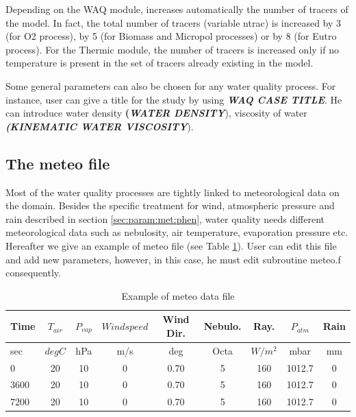  Depending on the WAQ module,  increases automatically the number of tracers of the model. In fact, the total number of tracers (variable ntrac) is increased by 3 (for O2 process), by 5 (for Biomass and Micropol processes) or by 8 (for Eutro process). For the Thermic module, the number of tracers is increased only if no temperature is present in the set of tracers already existing in the model.

 Some general parameters can also be chosen for any water quality process. For instance, user can give a title for the study by using \textbf{\textit{WAQ CASE TITLE}}. He can introduce water density \textbf{(\textit{WATER DENSITY}}), viscosity of water \textbf{\textit{(KINEMATIC WATER VISCOSITY}}).


\subsection{  The meteo file}
\label{subs:meteo:file}
 Most of the water quality processes are tightly linked to meteorological data on the domain. Besides the specific treatment for wind, atmospheric pressure and rain described in section \ref{sec:param:met:phen}, water quality needs different meteorological data such as nebulosity, air temperature, evaporation pressure etc. Hereafter we give an example of meteo file (see Table \ref{tab:meteo}). User can edit this file and add new parameters, however, in this case, he must edit subroutine meteo.f consequently.

\begin{table}
    \centering
  \begin{tabular}{|l|c|c|c|c|c|c|c|c|}
     \hline \hline
     Time & $T_{air}$ & $P_{vap}$ & $Wind speed$ & Wind Dir. & Nebulo. & Ray. & $P_{atm}$ & Rain \\
     \hline \hline
     sec & $deg C $ & hPa & m/s & deg & Octa & $W/m^2$ & mbar & mm \\
     \hline \hline
     0 & 20 & 10 & 0 & 0.70 & 5 & 160 & 1012.7 & 0 \\
     3600 & 20 & 10 & 0 & 0.70 & 5 & 160 & 1012.7 & 0 \\
     7200 & 20 & 10 & 0 & 0.70 & 5 & 160 & 1012.7 & 0 \\
     \hline
   \end{tabular}
  \caption{Example of meteo data file }\label{tab:meteo}
\end{table} 



